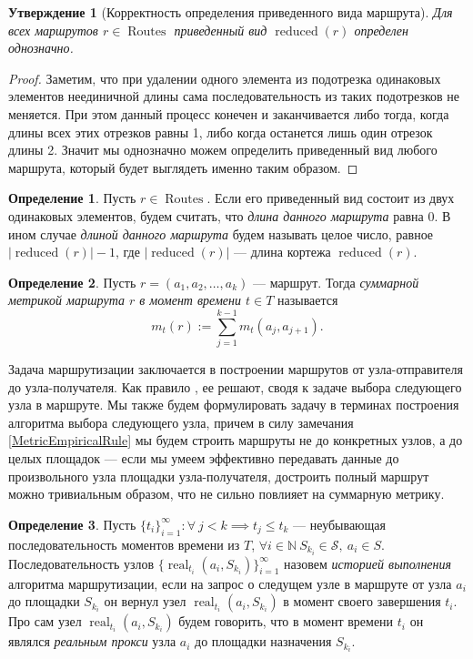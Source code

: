 \documentclass{article}
\theoremstyle{plain}
\theoremstyle{plain}
\theoremstyle{plain}
\theoremstyle{plain}
\newtheorem{claim}{Утверждение}[section]
\theoremstyle{definition}
\newtheorem{definition}{Определение}[section]
\theoremstyle{remark}
\theoremstyle{plain}
\DeclareMathOperator*{\real}{real}
\DeclareMathOperator*{\routes}{Routes}
\DeclareMathOperator*{\reduced}{reduced}
\begin{document}
\begin{claim}[Корректность определения приведенного вида маршрута]
    Для всех маршрутов $r \in \routes$ приведенный вид $\reduced(r)$ определен однозначно.
\end{claim}
\begin{proof}
    Заметим, что при удалении одного элемента из подотрезка одинаковых элементов неединичной длины сама последовательность из таких подотрезков не меняется. При этом данный процесс конечен и заканчивается либо тогда, когда длины всех этих отрезков равны 1, либо когда останется лишь один отрезок длины 2. Значит мы однозначно можем определить приведенный вид любого маршрута, который будет выглядеть именно таким образом.
\end{proof}

\begin{definition}
    Пусть $r \in \routes$. Если его приведенный вид состоит из двух одинаковых элементов, будем считать, что \textit{длина данного маршрута} равна 0. В ином случае \textit{длиной данного маршрута} будем называть целое число, равное $|\reduced(r)| - 1$, где $|\reduced(r)|$ --- длина кортежа $\reduced(r)$.
\end{definition}

\begin{definition}
\label{RouteMetricDefinition}
    Пусть $r = (a_1, a_2, \ldots, a_k)$ --- маршрут. Тогда \textit{суммарной метрикой маршрута $r$ в момент времени $t \in T$} называется 
    \[
        m_t(r) := \displaystyle \sum_{j = 1}^{k - 1} m_t(a_{j}, a_{j + 1}).
    \]
\end{definition}

Задача маршрутизации заключается в построении маршрутов от узла-отправителя до узла-получателя. Как правило \cite{RFC2328, RFC2453}, ее решают, сводя к задаче выбора следующего узла в маршруте. Мы также будем формулировать задачу в терминах построения алгоритма выбора следующего узла, причем в силу замечания \ref{MetricEmpiricalRule} мы будем строить маршруты не до конкретных узлов, а до целых площадок --- если мы умеем эффективно передавать данные до произвольного узла площадки узла-получателя, достроить полный маршрут можно тривиальным образом, что не сильно повлияет на суммарную метрику.

\begin{definition}
    Пусть $\{t_i\}_{i = 1}^{\infty} : \forall\ j < k \implies t_j \leq t_k$ --- неубывающая последовательность моментов времени из $T$, $\forall i \in \mathbb{N}\ S_{k_i} \in \mathcal{S},\ a_i \in S$. Последовательность узлов $\{\real_{t_i}(a_i, S_{k_i})\}_{i = 1}^{\infty}$ назовем \textit{историей выполнения} алгоритма маршрутизации, если на запрос о следущем узле в маршруте от узла $a_i$ до площадки $S_{k_i}$ он вернул узел $\real_{t_i}(a_i, S_{k_i})$ в момент своего завершения $t_i$. Про сам узел $\real_{t_i}(a_i, S_{k_i})$ будем говорить, что в момент времени $t_i$ он являлся \textit{реальным прокси} узла $a_i$ до площадки назначения $S_{k_i}$.
\end{definition}
\end{document}
